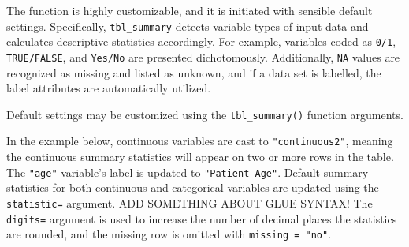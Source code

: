 The function is highly customizable, and it is initiated with sensible default settings.
Specifically, \texttt{tbl\_summary} detects variable types of input data and calculates descriptive statistics accordingly.
For example, variables coded as \texttt{0/1}, \texttt{TRUE/FALSE}, and \texttt{Yes/No} are presented dichotomously.
Additionally, \texttt{NA} values are recognized as missing and listed as unknown, and if a data set is labelled, the label attributes are automatically utilized. 

Default settings may be customized using the \texttt{tbl\_summary()} function arguments.



In the example below, continuous variables are cast to \texttt{"continuous2"}, meaning the continuous summary statistics will appear on two or more rows in the table.
The \texttt{"age"} variable's label is updated to \texttt{"Patient Age"}.
Default summary statistics for both continuous and categorical variables are updated using the \texttt{statistic=} argument. ADD SOMETHING ABOUT GLUE SYNTAX!
The \texttt{digits=} argument is used to increase the number of decimal places the statistics are rounded, and the missing row is omitted with \texttt{missing = "no"}.


